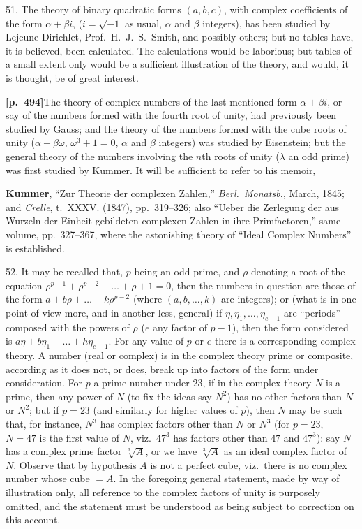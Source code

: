 \documentclass[11pt,a4paper]{article}
\begin{document}
51. The theory of binary quadratic forms $(a, b, c)$, with complex coefficients of the form $\alpha + \beta i$, ($i = \sqrt{-1}$ as usual, $\alpha$ and $\beta$ integers), has been studied by Lejeune Dirichlet, Prof.\ H.~J.~S.~Smith, and possibly others; but no tables have, it is believed, been calculated. The calculations would be laborious; but tables of a small extent only would be a sufficient illustration of the theory, and would, it is thought, be of great interest.

\noindent\textbf{[p.~494]}\quad The theory of complex numbers of the last-mentioned form $\alpha + \beta i$, or say of the numbers formed with the fourth root of unity, had previously been studied by Gauss; and the theory of the numbers formed with the cube roots of unity ($\alpha + \beta\omega$, $\omega^{3} + 1 = 0$, $\alpha$ and $\beta$ integers) was studied by Eisenstein; but the general theory of the numbers involving the $n$th roots of unity ($\lambda$ an odd prime) was first studied by Kummer. It will be sufficient to refer to his memoir,

\textbf{Kummer}, ``Zur Theorie der complexen Zahlen,'' \textit{Berl.\ Monatsb.}, March, 1845; and \textit{Crelle}, t.~XXXV. (1847), pp.~319--326; also ``Ueber die Zerlegung der aus Wurzeln der Einheit gebildeten complexen Zahlen in ihre Primfactoren,'' same volume, pp.~327--367, where the astonishing theory of ``Ideal Complex Numbers'' is established.

52. It may be recalled that, $p$ being an odd prime, and $\rho$ denoting a root of the equation $\rho^{p-1} + \rho^{p-2} + \ldots + \rho + 1 = 0$, then the numbers in question are those of the form $a + b\rho + \ldots + k\rho^{p-2}$ (where $(a, b, \ldots, k)$ are integers); or (what is in one point of view more, and in another less, general) if $\eta, \eta_{1}, \ldots, \eta_{e-1}$ are ``periods'' composed with the powers of $\rho$ ($e$ any factor of $p - 1$), then the form considered is $a\eta + b\eta_{1} + \ldots + h\eta_{e-1}$. For any value of $p$ or $e$ there is a corresponding complex theory. A number (real or complex) is in the complex theory prime or composite, according as it does not, or does, break up into factors of the form under consideration. For $p$ a prime number under $23$, if in the complex theory $N$ is a prime, then any power of $N$ (to fix the ideas say $N^{2}$) has no other factors than $N$ or $N^{2}$; but if $p = 23$ (and similarly for higher values of $p$), then $N$ may be such that, for instance, $N^{3}$ has complex factors other than $N$ or $N^{3}$ (for $p = 23$, $N = 47$ is the first value of $N$, viz.\ $47^{3}$ has factors other than $47$ and $47^{3}$): say $N$ has a complex prime factor $\sqrt[3]{A}$, or we have $\sqrt[3]{A}$ as an ideal complex factor of $N$. Observe that by hypothesis $A$ is not a perfect cube, viz.\ there is no complex number whose cube $= A$. In the foregoing general statement, made by way of illustration only, all reference to the complex factors of unity is purposely omitted, and the statement must be understood as being subject to correction on this account.
\end{document}
